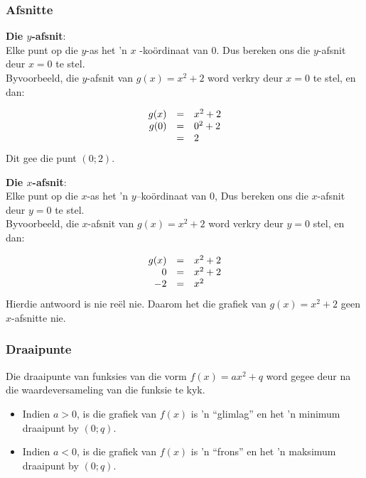 \subsubsection*{Afsnitte}
\textbf{Die $y$-afsnit}:\\
Elke punt op die $y$-as het 'n $x$ -ko\"ordinaat van $0$. Dus bereken ons die $y$-afsnit deur $x = 0$ te stel.\\

Byvoorbeeld, die $y$-afsnit van $g(x)={x}^{2}+2$ word verkry deur $x=0$ te stel, en dan:\par 

\begin{equation*}
\begin{array}{ccl}\hfill g(x)& =& {x}^{2}+2\hfill \\ 
\hfill g(0)& =& {0}^{2}+2\hfill \\
 & =& 2\hfill 
\end{array}
\end{equation*}
Dit gee die punt $(0;2)$.\par

\textbf{Die $x$-afsnit}:\\
Elke punt op die $x$-as het 'n $y$--ko\"ordinaat van $0$, Dus bereken ons die $x$-afsnit deur $y=0$ te stel.\\

Byvoorbeeld, die $x$-afsnit van $g(x)={x}^{2}+2$ word verkry deur $y=0$ stel, en dan:\par

\begin{equation*}
\begin{array}{ccl}\hfill g(x)& =& {x}^{2}+2\hfill \\
 \hfill 0& =& x^{2}+2\hfill \\
 \hfill -2& =& x^{2}\hfill 
\end{array}
\end{equation*}
Hierdie antwoord is nie reël nie. Daarom het die grafiek van $g(x)={x}^{2}+2$ geen $x$-afsnitte nie. 

\subsubsection*{Draaipunte}

Die draaipunte van funksies van die vorm $f(x)=ax^{2}+q$ word gegee deur na die waardeversameling van
die funksie te kyk. 
\begin{itemize}
 \item Indien $a>0$, is die grafiek van $f(x)$ is 'n ``glimlag'' en het 'n minimum draaipunt by $(0;q)$.
\item Indien $a<0$, is die grafiek van $f(x)$ is 'n ``frons'' en het 'n maksimum
draaipunt by $(0;q)$.
\end{itemize}


